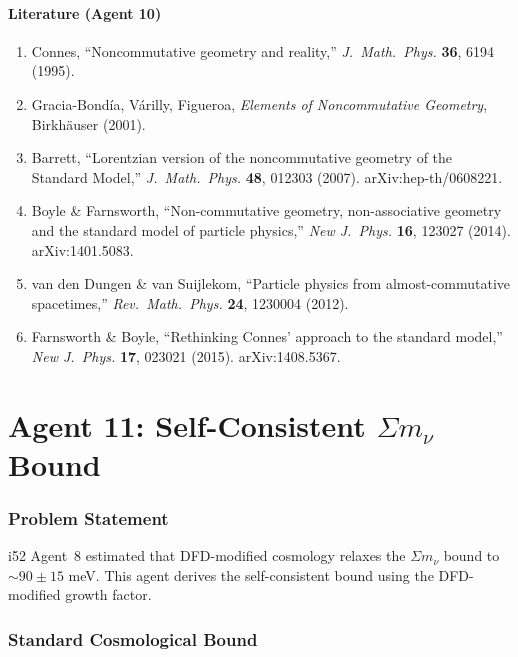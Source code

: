 \documentclass[11pt,a4paper]{article}
\begin{document}
\subsection{Literature (Agent 10)}

\begin{enumerate}
\item Connes, ``Noncommutative geometry and reality,'' \textit{J.\ Math.\ Phys.} \textbf{36}, 6194 (1995).
\item Gracia-Bond\'ia, V\'arilly, Figueroa, \textit{Elements of Noncommutative Geometry}, Birkh\"auser (2001).
\item Barrett, ``Lorentzian version of the noncommutative geometry of the Standard Model,'' \textit{J.\ Math.\ Phys.} \textbf{48}, 012303 (2007). arXiv:hep-th/0608221.
\item Boyle \& Farnsworth, ``Non-commutative geometry, non-associative geometry and the standard model of particle physics,'' \textit{New J.\ Phys.} \textbf{16}, 123027 (2014). arXiv:1401.5083.
\item van den Dungen \& van Suijlekom, ``Particle physics from almost-commutative spacetimes,'' \textit{Rev.\ Math.\ Phys.} \textbf{24}, 1230004 (2012).
\item Farnsworth \& Boyle, ``Rethinking Connes' approach to the standard model,'' \textit{New J.\ Phys.} \textbf{17}, 023021 (2015). arXiv:1408.5367.
\end{enumerate}


\part{Agent 11: Self-Consistent $\Sigma m_\nu$ Bound}
\label{part:mnu}

\section{Problem Statement}

i52 Agent~8 estimated that DFD-modified cosmology relaxes the $\Sigma m_\nu$ bound to $\sim 90 \pm 15$ meV. This agent derives the self-consistent bound using the DFD-modified growth factor.

\section{Standard Cosmological Bound}
\end{document}
